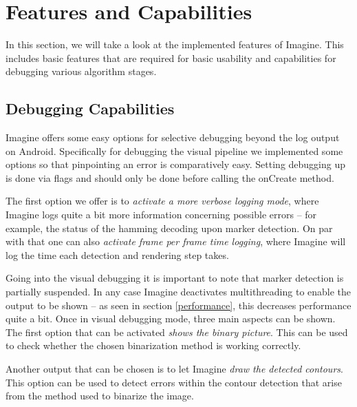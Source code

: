 \section{Features and Capabilities}

In this section, we will take a look at the implemented features of Imagine.
This includes basic features that are required for basic usability and capabilities for debugging various algorithm stages.

\subsection{Debugging Capabilities}

Imagine offers some easy options for selective debugging beyond the log output on Android.
Specifically for debugging the visual pipeline we implemented some options so that pinpointing an error is comparatively easy.
Setting debugging up is done via flags and should only be done before calling the onCreate method.

The first option we offer is to \textit{activate a more verbose logging mode}, where Imagine logs quite a bit more information concerning possible errors – for example, the status of the hamming decoding upon marker detection.
On par with that one can also \textit{activate frame per frame time logging}, where Imagine will log the time each detection and rendering step takes.

Going into the visual debugging it is important to note that marker detection is partially suspended.
In any case Imagine deactivates multithreading to enable the output to be shown – as seen in section \ref{performance}, this decreases performance quite a bit.
Once in visual debugging mode, three main aspects can be shown.
The first option that can be activated \textit{shows the binary picture}.
This can be used to check whether the chosen binarization method is working correctly.

Another output that can be chosen is to let Imagine \textit{draw the detected contours}.
This option can be used to detect errors within the contour detection that arise from the method used to binarize the image.

